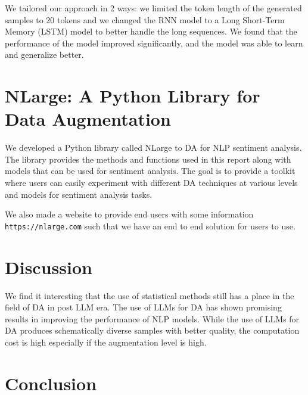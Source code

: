 \documentclass{article}
\newcommand{\code}[1]{\texttt{#1}}
\begin{document}
We tailored our approach in 2 ways: we limited the token length of the
generated samples to 20 tokens and we changed the RNN model to a Long
Short-Term Memory (LSTM) model to better handle the long sequences. We found
that the performance of the model improved significantly, and the model was
able to learn and generalize better.

\section{NLarge: A Python Library for Data Augmentation}

We developed a Python library called NLarge to DA for NLP sentiment analysis.
The library provides the methods and functions used in this report along with
models that can be used for sentiment analysis. The goal is to provide a
toolkit where users can easily experiment with different DA techniques at
various levels and models for sentiment analysis tasks.

We also made a website to provide end users with some information
\code{https://nlarge.com} such that we have an end to end solution for users to
use.


\section{Discussion}

We find it interesting that the use of statistical methods still has a place in
the field of DA in post LLM era. The use of LLMs for DA has shown promising
results in improving the performance of NLP models. While the use of LLMs for
DA produces schematically diverse samples with better quality, the computation
cost is high especially if the augmentation level is high.

\section{Conclusion}



\end{document}
